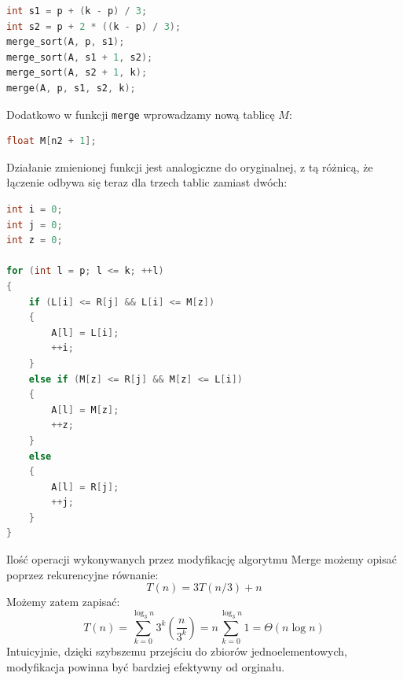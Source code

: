 \documentclass{article}
\begin{document}
\begin{lstlisting}[style=mystyle, language=C++, caption={Fragment implementacji modyfikacji Merge Sort}, label={lst:mergesort2}]
int s1 = p + (k - p) / 3;
int s2 = p + 2 * ((k - p) / 3);
merge_sort(A, p, s1);
merge_sort(A, s1 + 1, s2);
merge_sort(A, s2 + 1, k);
merge(A, p, s1, s2, k);
\end{lstlisting}

Dodatkowo w funkcji \texttt{merge} wprowadzamy nową tablicę \( M \):
\begin{lstlisting}[style=mystyle, language=C++, caption={Fragment implementacji modyfikacji Merge}, label={lst:merge2}]
float M[n2 + 1];
\end{lstlisting}

Działanie zmienionej funkcji jest analogiczne do oryginalnej, z tą różnicą, że łączenie odbywa się teraz dla trzech tablic zamiast dwóch:
\begin{lstlisting}[style=mystyle, language=C++, caption={Fragment implementacji modyfikacji Merge}, label={lst:merge2l}]
int i = 0;
int j = 0;
int z = 0;

for (int l = p; l <= k; ++l)
{
    if (L[i] <= R[j] && L[i] <= M[z])
    {
        A[l] = L[i];
        ++i;
    }
    else if (M[z] <= R[j] && M[z] <= L[i])
    {
        A[l] = M[z];
        ++z;
    }
    else
    {
        A[l] = R[j];
        ++j;
    }
}
\end{lstlisting}
Ilość operacji wykonywanych przez modyfikację algorytmu Merge możemy opisać poprzez rekurencyjne równanie:
\[
    T(n) = 3T(n/3) + n
\]
Możemy zatem zapisać:
\[
    T(n) = \sum_{k=0}^{\log_3 n} 3^k\left(\frac{n}{3^k}\right) = n\sum_{k=0}^{\log_3 n} 1 = \Theta(n \log n)
\]
Intuicyjnie, dzięki szybszemu przejściu do zbiorów jednoelementowych, modyfikacja powinna być bardziej efektywny od orginału.
\end{document}
